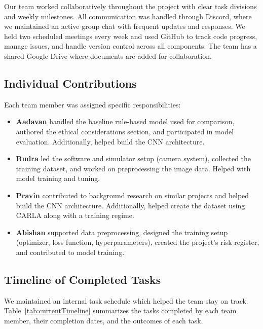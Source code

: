 \documentclass{article} %
\begin{document}
Our team worked collaboratively throughout the project with clear task divisions and weekly milestones. All communication was handled through Discord, where we maintained an active group chat with frequent updates and responses. We held two scheduled meetings every week and used GitHub to track code progress, manage issues, and handle version control across all components. The team has a shared Google Drive where documents are added for collaboration. 


\subsection{Individual Contributions}
Each team member was assigned specific responsibilities:

\begin{itemize}
  \item \textbf{Aadavan} handled the baseline rule-based model used for comparison, authored the ethical considerations section, and participated in model evaluation. Additionally, helped build the CNN architecture.

  \item \textbf{Rudra} led the software and simulator setup (camera system), collected the training dataset, and worked on preprocessing the image data. Helped with model training and tuning. 

  \item \textbf{Pravin} contributed to background research on similar projects and helped build the CNN architecture. Additionally, helped create the dataset using CARLA along with a training regime.

  \item \textbf{Abishan} supported data preprocessing, designed the training setup (optimizer, loss function, hyperparameters), created the project's risk register, and contributed to model training.
\end{itemize}

\subsection{Timeline of Completed Tasks}

We maintained an internal task schedule which helped the team stay on track. Table~\ref{tab:currentTimeline} summarizes the tasks completed by each team member, their completion dates, and the outcomes of each task.
\end{document}
